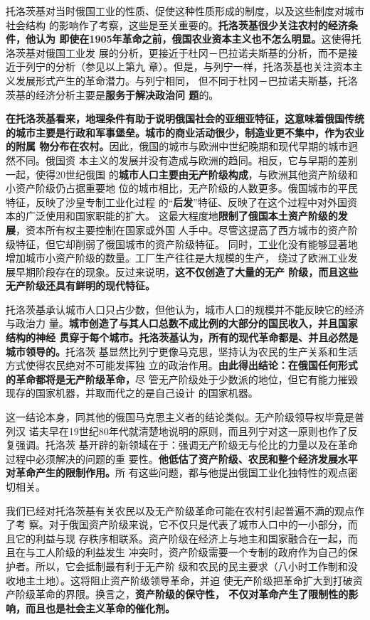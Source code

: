 托洛茨基对当时俄国工业的性质、促使这种性质形成的制度，以及这些制度对城市社会结构
的影响作了考察，这些是至关重要的。\textbf{托洛茨基很少关注农村的经济条件，他认为
  即使在1905年革命之前，俄国农业资本主义也不怎么明显。}这使得托洛茨基对俄国工业发
展的分析，更接近于杜冈－巴拉诺夫斯基的分析，而不是接近于列宁的分析（参见以上第九
章）。但是，与列宁一样，托洛茨基也关注资本主义发展形式产生的革命潜力。与列宁相同，
但不同于杜冈－巴拉诺夫斯基，托洛茨基的经济分析主要是\textbf{服务于解决政治问
  题}的。

\textbf{在托洛茨基看来，地理条件有助于说明俄国社会的亚细亚特征，这意味着俄国传统
  的城市主要是行政和军事堡垒。城市的商业活动很少，制造业更不集中，作为农业的附属
  物分布在农村。}因此，俄国的城市与欧洲中世纪晚期和现代早期的城市迥然不同。俄国资
本主义的发展并没有造成与欧洲的趋同。相反，它与早期的差别一起，使得20世纪俄国
的\textbf{城市人口主要由无产阶级构成}，与欧洲其他资产阶级和小资产阶级仍占据重要地
位的城市相比，无产阶级的人数更多。俄国城市的平民特征，反映了沙皇专制工业化过程
的“\textbf{后发}”特征、反映了在这个过程中对外国资本的广泛使用和国家职能的扩大。
这最大程度地\textbf{限制了俄国本土资产阶级的发展}，资本所有权主要控制在国家或外国
人手中。尽管这提高了西方城市的资产阶级特征，但它却削弱了俄国城市的资产阶级特征。
同时，工业化没有能够显著地增加城市小资产阶级的数量。工厂生产往往是大规模的生产，
绕过了欧洲工业发展早期阶段存在的现象。反过来说明，\textbf{这不仅创造了大量的无产
  阶级，而且这些无产阶级还具有鲜明的现代特征。}

托洛茨基承认城市人口只占少数，但他认为，城市人口的规模并不能反映它的经济与政治力
量。\textbf{城市创造了与其人口总数不成比例的大部分的国民收入，并且国家结构的神经
贯穿于每个城市。托洛茨基认为，所有的现代革命都是、并且必然是城市领导的。}托洛茨
基显然比列宁更像马克思，坚持认为农民的生产关系和生活方式使得农民绝对不可能发挥独
立的政治作用。\textbf{由此得出结论：在俄国任何形式的革命都将是无产阶级革命，}尽
管无产阶级处于少数派的地位，但它有能力摧毁现存的国家机器，并取而代之的是自己设计
的国家机器。

这一结论本身，同其他的俄国马克思主义者的结论类似。无产阶级领导权毕竟是普列汉
诺夫早在19世纪80年代就清楚地说明的原则，而且列宁对这一原则也作了反复强调。托洛茨
基开辟的新领域在于：强调无产阶级无与伦比的力量以及在革命过程中必须解决的问题的重
要性。\textbf{他低估了资产阶级、农民和整个经济发展水平对革命产生的限制作用。}所
有这些问题，都与他提出俄国工业化独特性的观点密切相关。

我们已经对托洛茨基有关农民以及无产阶级革命可能在农村引起普遍不满的观点作了考
察。对于俄国资产阶级来说，它不仅只是代表了城市人口中的一小部分，而且它的利益与现
存秩序相联系。资产阶级在经济上与地主和国家融合在一起，而且在与工人阶级的利益发生
冲突时，资产阶级需要一个专制的政府作为自己的保护者。所以，它会抵制最有利于无产阶
级和农民的民主要求（八小时工作制和没收地主土地）。这将阻止资产阶级领导革命，并迫
使无产阶级把革命扩大到打破资产阶级革命的界限。换言之，\textbf{资产阶级的保守性，
不仅对革命产生了限制性的影响，而且也是社会主义革命的催化剂。}

